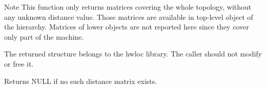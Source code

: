 \begin{DoxyNote}{Note}
This function only returns matrices covering the whole topology, without any unknown distance value. Those matrices are available in top-\/level object of the hierarchy. Matrices of lower objects are not reported here since they cover only part of the machine.
\end{DoxyNote}
The returned structure belongs to the hwloc library. The caller should not modify or free it.

\begin{DoxyReturn}{Returns}
{\ttfamily NULL} if no such distance matrix exists. 
\end{DoxyReturn}
